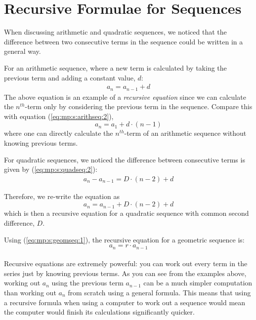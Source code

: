 \section{Recursive Formulae for Sequences}

When discussing arithmetic and quadratic sequences, we noticed that the difference between two
consecutive terms in the sequence could be written in a general way. 

For an arithmetic sequence, where a new term is calculated by taking the previous term and adding a
constant value, $d$:
\begin{eqnarray*}
a_n = a_{n-1} + d
\end{eqnarray*}
The above equation is an example of a \textit{recursive equation} since we can calculate the
$n^{th}$-term only by considering the previous term in the sequence. Compare this with equation
(\ref{eq:mp:s:arithseq:2}),
\begin{equation}
a_n = a_1 + d \cdot (n - 1)
\end{equation}
where one can directly calculate the $n^{th}$-term of an arithmetic sequence without knowing
previous terms. 

For quadratic sequences, we noticed the difference between consecutive terms is given by
(\ref{eq:mp:s:quadseq:2}):
\begin{eqnarray*}
a_n - a_{n-1} = D \cdot (n-2) + d
\end{eqnarray*}

Therefore, we re-write the equation as
\begin{equation}
a_n = a_{n-1} + D \cdot (n-2) + d
\end{equation}
which is then a recursive equation for a quadratic sequence with common second difference, $D$. 

Using (\ref{eq:mp:s:geomseq:1}), the recursive equation for a geometric sequence is:
\begin{equation}
a_n = r \cdot a_{n-1}
\end{equation}
\\
Recursive equations are extremely powerful: you can work out every term in the series just by
knowing previous terms. As you can see from the examples above, working out $a_n$ using the previous
term $a_{n-1}$ can be a much simpler computation than working out $a_n$ from scratch using a general
formula. This means that using a recursive formula when using a computer to work out a sequence
would mean the computer would finish its calculations significantly quicker.

